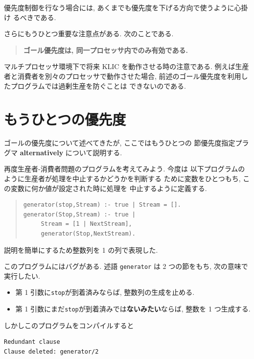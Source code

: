 \documentclass[a4,titlepage]{jsreport}
\let\dg\bf
\begin{document}
優先度制御を行なう場合には, あくまでも優先度を下げる方向で使うように心掛け
るべきである.

さらにもうひとつ重要な注意点がある.  次のことである.
\begin{quote}
{\dg ゴール優先度は, 同一プロセッサ内でのみ有効である.}
\end{quote}
マルチプロセッサ環境下で将来 KLIC を動作させる時の注意である.
例えば生産者と消費者を別々のプロセッサで動作させた場合, 
前述のゴール優先度を利用したプログラムでは過剰生産を防ぐことは
できないのである.  

\section{もうひとつの優先度}
ゴールの優先度について述べてきたが, ここではもうひとつの
節優先度指定プラグマ {\bf alternatively} について説明する.  

再度生産者-消費者問題のプログラムを考えてみよう.  今度は
以下プログラムのように生産者が処理を中止するかどうかを判断する
ために変数をひとつもち, この変数に何か値が設定された時に処理を
中止するように定義する. 
\begin{quote}
\begin{Verbatim}[baselinestretch=0.8]
generator(stop,Stream) :- true | Stream = [].
generator(Stop,Stream) :- true |
     Stream = [1 | NextStream],
     generator(Stop,NextStream).
\end{Verbatim}
\end{quote}
説明を簡単にするため整数列を 1 の列で表現した.

このプログラムにはバグがある.  述語 {\tt generator} は 2 つの節をもち, 
次の意味で実行したい.  

\begin{itemize}
\item 第 1 引数に{\tt stop}が到着済みならば, 整数列の生成を止める.  
\item 第 1 引数にまだ{\tt stop}が到着済みでは{\dg ないみたい}ならば, 
整数を 1 つ生成する.  
\end{itemize}

しかしこのプログラムをコンパイルすると

\begin{Verbatim}[frame=single,baselinestretch=0.8]
Redundant clause
Clause deleted: generator/2
\end{Verbatim}
\end{document}
